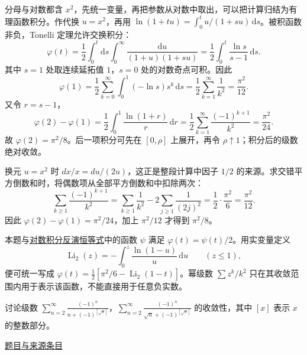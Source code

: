 \documentclass[12pt,fontset=fandol]{ctexart}
\begin{document}
\begin{solve}\label{ans:ch02-16th-A:2}

分母与对数都含 $x^2$，先统一变量，再把参数从对数中取出，可以把计算归结为有理函数积分。作代换 $u=x^2$，再用 $\ln(1+tu)=\int_0^t u/(1+su)\,\mathrm ds$。被积函数非负，Tonelli 定理允许交换积分：
\[
\varphi(t)=\frac12\int_0^t\!\mathrm ds
\int_0^\infty\frac{\mathrm du}{(1+u)(1+su)}
=\frac12\int_0^t\frac{\ln s}{s-1}\,\mathrm ds.
\]
其中 $s=1$ 处取连续延拓值 $1$，$s=0$ 处的对数奇点可积。因此
\[
\varphi(1)=\frac12\sum_{k=0}^\infty
\int_0^1(-\ln s)s^k\,\mathrm ds
=\frac12\sum_{k=1}^\infty\frac1{k^2}
=\frac{\pi^2}{12}.
\]
又令 $r=s-1$，
\[
\varphi(2)-\varphi(1)
=\frac12\int_0^1\frac{\ln(1+r)}r\,\mathrm dr
=\frac12\sum_{k=1}^\infty\frac{(-1)^{k+1}}{k^2}
=\frac{\pi^2}{24}.
\]
故 $\varphi(2)=\pi^2/8$。后一项积分可先在 $[0,\rho]$ 上展开，再令 $\rho\uparrow1$；积分后的级数绝对收敛。

换元 $u=x^2$ 时 $dx/x=du/(2u)$，这正是整段计算中因子 $1/2$ 的来源。求交错平方倒数和时，将偶数项从全部平方倒数和中扣除两次：
\[
\sum_{k\ge1}\frac{(-1)^{k+1}}{k^2}
=\sum_{k\ge1}\frac1{k^2}-2\sum_{j\ge1}\frac1{(2j)^2}
=\frac12\cdot\frac{\pi^2}{6}=\frac{\pi^2}{12}.
\]
因此 $\varphi(2)-\varphi(1)=\pi^2/24$，加上 $\pi^2/12$ 才得到 $\pi^2/8$。

\end{solve}

\begin{remark}[方法与条件]本题与\hyperref[pr:ch05-14th-A-makeup:6]{对数积分反演恒等式}中的函数 $\psi$ 满足 $\varphi(t)=\psi(t)/2$。用实变量定义
\[
\operatorname{Li}_2(z)=-\int_0^z\frac{\ln(1-u)}u\,\mathrm du\qquad(z\leq1),
\]
便可统一写成 $\varphi(t)=\tfrac12[\pi^2/6-\operatorname{Li}_2(1-t)]$。幂级数 $\sum z^k/k^2$ 只在其收敛范围内用于表示该函数，不能直接用于任意负实数。\end{remark}

\begin{example}[来源序号5]\label{ex:ch02-16th-A:5}\label{pr:ch02-16th-A:5}

讨论级数 $\sum_{n=2}^{\infty} \frac{(-1)^{n}}{n+(-1)^{[\sqrt{n}]}}$，$\sum_{n=2}^{\infty} \frac{(-1)^{n}}{\sqrt{n}+(-1)^{[\sqrt{n}]}}$ 的收敛性，其中 $[x]$ 表示 $x$ 的整数部分。

\par\href{https://github.com/lzxcr/cmc-mathematics/blob/64916fa1fdbc3e444a652eca204d5669058ee321/src/problems/preliminary/16/05.md}{题目与来源条目}

\end{example}
\end{document}
